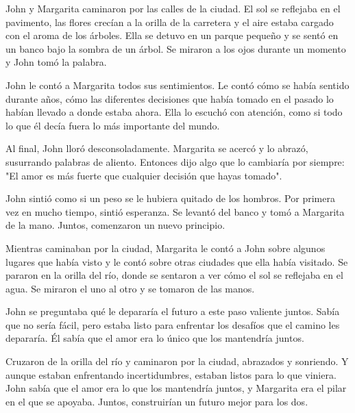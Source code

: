

John y Margarita caminaron por las calles de la ciudad. El sol se reflejaba en el pavimento, las flores crecían a la orilla de la carretera y el aire estaba cargado con el aroma de los árboles. Ella se detuvo en un parque pequeño y se sentó en un banco bajo la sombra de un árbol. Se miraron a los ojos durante un momento y John tomó la palabra.

John le contó a Margarita todos sus sentimientos. Le contó cómo se había sentido durante años, cómo las diferentes decisiones que había tomado en el pasado lo habían llevado a donde estaba ahora. Ella lo escuchó con atención, como si todo lo que él decía fuera lo más importante del mundo.

Al final, John lloró desconsoladamente. Margarita se acercó y lo abrazó, susurrando palabras de aliento. Entonces dijo algo que lo cambiaría por siempre: "El amor es más fuerte que cualquier decisión que hayas tomado".

John sintió como si un peso se le hubiera quitado de los hombros. Por primera vez en mucho tiempo, sintió esperanza. Se levantó del banco y tomó a Margarita de la mano. Juntos, comenzaron un nuevo principio.

Mientras caminaban por la ciudad, Margarita le contó a John sobre algunos lugares que había visto y le contó sobre otras ciudades que ella había visitado. Se pararon en la orilla del río, donde se sentaron a ver cómo el sol se reflejaba en el agua. Se miraron el uno al otro y se tomaron de las manos.

John se preguntaba qué le depararía el futuro a este paso valiente juntos. Sabía que no sería fácil, pero estaba listo para enfrentar los desafíos que el camino les depararía. Él sabía que el amor era lo único que los mantendría juntos.

Cruzaron de la orilla del río y caminaron por la ciudad, abrazados y sonriendo. Y aunque estaban enfrentando incertidumbres, estaban listos para lo que viniera. John sabía que el amor era lo que los mantendría juntos, y Margarita era el pilar en el que se apoyaba. Juntos, construirían un futuro mejor para los dos.